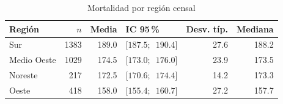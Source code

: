 \begin{table}[htbp]
\centering
\small
\caption{Mortalidad por región censal}\label{tab:regiones}
\begin{tabular}{l r r l r r}
\toprule
Región & $n$ & Media & IC 95\,\% & Desv. típ. & Mediana \\
\midrule
Sur & \num{1383} & \num{189.0} & $[\num{187.5};$\allowbreak\ $\num{190.4}]$ & \num{27.6} & \num{188.2} \\
Medio Oeste & \num{1029} & \num{174.5} & $[\num{173.0};$\allowbreak\ $\num{176.0}]$ & \num{23.9} & \num{173.5} \\
Noreste & \num{217} & \num{172.5} & $[\num{170.6};$\allowbreak\ $\num{174.4}]$ & \num{14.2} & \num{173.3} \\
Oeste & \num{418} & \num{158.0} & $[\num{155.4};$\allowbreak\ $\num{160.7}]$ & \num{27.2} & \num{157.7} \\
\bottomrule
\end{tabular}
\par{}
\end{table}
